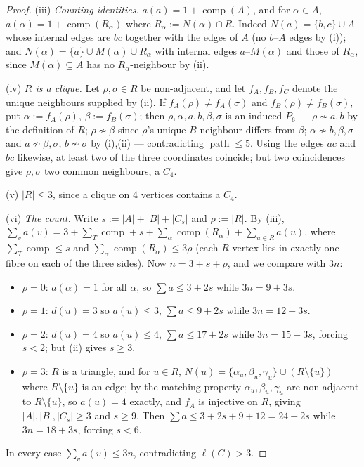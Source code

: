 \documentclass[11pt]{article}
\theoremstyle{plain}
\theoremstyle{definition}
\theoremstyle{remark}
\numberwithin{equation}{section}
\newcommand{\pth}{\operatorname{path}}
\newcommand{\comp}{\operatorname{comp}}
\begin{document}
\begin{proof}
(iii) \emph{Counting identities.} $a(a) = 1 + \comp(A)$, and for $\alpha \in A$,
$a(\alpha) = 1 + \comp(R_\alpha)$ where $R_\alpha := N(\alpha)\cap R$. Indeed
$N(a) = \{b,c\}\cup A$ whose internal edges are $bc$ together with the edges of $A$ (no
$b$--$A$ edges by (i)); and $N(\alpha) = \{a\} \cup M(\alpha) \cup R_\alpha$ with internal
edges $a$--$M(\alpha)$ and those of $R_\alpha$, since $M(\alpha) \subseteq A$ has no
$R_\alpha$-neighbour by (ii).

(iv) \emph{$R$ is a clique.} Let $\rho,\sigma \in R$ be non-adjacent, and let $f_A, f_B,
f_C$ denote the unique neighbours supplied by (ii). If $f_A(\rho)\ne f_A(\sigma)$ and
$f_B(\rho) \ne f_B(\sigma)$, put $\alpha := f_A(\rho)$, $\beta := f_B(\sigma)$; then
$\rho, \alpha, a, b, \beta, \sigma$ is an induced $P_6$ --- $\rho \not\sim a,b$ by the
definition of $R$; $\rho \not\sim\beta$ since $\rho$'s unique $B$-neighbour differs from
$\beta$; $\alpha \not\sim b, \beta, \sigma$ and $a \not\sim \beta,\sigma$, $b \not\sim\sigma$
by (i),(ii) --- contradicting $\pth \le 5$. Using the edges $ac$ and $bc$ likewise, at least
two of the three coordinates coincide; but two coincidences give $\rho,\sigma$ two common
neighbours, a $C_4$.

(v) $|R| \le 3$, since a clique on $4$ vertices contains a $C_4$.

(vi) \emph{The count.} Write $s := |A|+|B|+|C_s|$ and $\rho := |R|$. By (iii),
$\sum_v a(v) = 3 + \sum_{T}\comp + s + \sum_\alpha \comp(R_\alpha) + \sum_{u \in R} a(u)$,
where $\sum_T \comp \le s$ and $\sum_\alpha \comp(R_\alpha) \le 3\rho$ (each $R$-vertex lies
in exactly one fibre on each of the three sides). Now $n = 3 + s + \rho$, and we compare with
$3n$:
\begin{itemize}
\item $\rho = 0$: $a(\alpha) = 1$ for all $\alpha$, so $\sum a \le 3 + 2s$ while
$3n = 9+3s$.
\item $\rho = 1$: $d(u) = 3$ so $a(u) \le 3$, $\sum a \le 9 + 2s$ while $3n = 12+3s$.
\item $\rho = 2$: $d(u) = 4$ so $a(u) \le 4$, $\sum a \le 17+2s$ while $3n = 15+3s$, forcing
$s < 2$; but (ii) gives $s \ge 3$.
\item $\rho = 3$: $R$ is a triangle, and for $u \in R$,
$N(u) = \{\alpha_u,\beta_u,\gamma_u\} \cup (R \setminus\{u\})$ where $R\setminus\{u\}$ is an
edge; by the matching property $\alpha_u,\beta_u,\gamma_u$ are non-adjacent to
$R\setminus\{u\}$, so $a(u) = 4$ exactly, and $f_A$ is injective on $R$, giving
$|A|,|B|,|C_s| \ge 3$ and $s \ge 9$. Then $\sum a \le 3+2s+9+12 = 24+2s$ while
$3n = 18+3s$, forcing $s < 6$.
\end{itemize}
In every case $\sum_v a(v) \le 3n$, contradicting $\ell(C) > 3$.
\end{proof}
\end{document}
